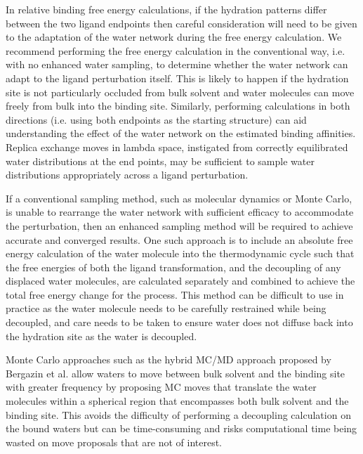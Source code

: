 \documentclass[9pt,bestpractices]{livecoms}
\begin{document}
In relative binding free energy calculations, if the hydration patterns differ between the two ligand endpoints then careful consideration will need to be given to the adaptation of the water network during the free energy calculation. We recommend performing the free energy calculation in the conventional way, i.e. with no enhanced water sampling, to determine whether the water network can adapt to the ligand perturbation itself. This is likely to happen if the hydration site is not particularly occluded from bulk solvent and water molecules can move freely from bulk into the binding site. Similarly, performing calculations in both directions (i.e. using both endpoints as the starting structure) can aid understanding the effect of the water network on the estimated binding affinities. Replica exchange moves in lambda space, instigated from correctly equilibrated water distributions at the end points, may be sufficient to sample water distributions appropriately across a ligand perturbation.

If a conventional sampling method, such as molecular dynamics or Monte Carlo, is unable to rearrange the water network with sufficient efficacy to accommodate the perturbation, then an enhanced sampling method will be required to achieve accurate and converged results. One such approach is to include an absolute free energy calculation of the water molecule into the thermodynamic cycle\cite{ross2020enhancing, hamelberg2004standard, barillari2007classification, yu2008free, ge2022abfewat} such that the free energies of both the ligand transformation, and the decoupling of any displaced water molecules, are calculated separately and combined to achieve the total free energy change for the process. This method can be difficult to use in practice as the water molecule needs to be carefully restrained while being decoupled, and care needs to be taken to ensure water does not diffuse back into the hydration site as the water is decoupled.

Monte Carlo approaches such as the hybrid MC/MD approach proposed by Bergazin et al.\cite{bergazin2021enhancing, ben-shalom2021fast, ge2022enhancing} allow waters to move between bulk solvent and the binding site with greater frequency by proposing MC moves that translate the water molecules within a spherical region that encompasses both bulk solvent and the binding site. This avoids the difficulty of performing a decoupling calculation on the bound waters but can be time-consuming and risks computational time being wasted on move proposals that are not of interest.
\end{document}
